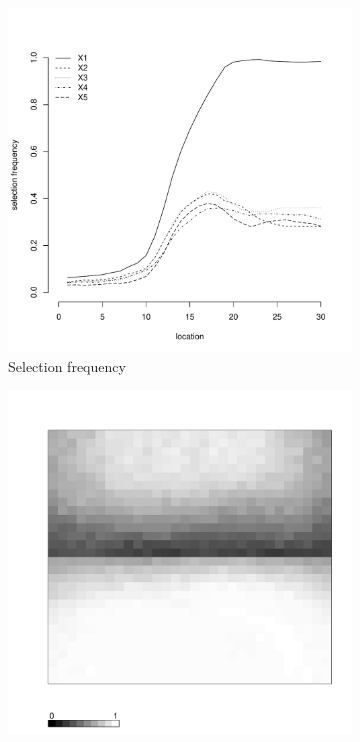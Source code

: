 \documentclass[authoryear, review, 11pt]{elsarticle}
\begin{document}
\begin{figure}
\begin{subfigure}[b]{0.45\textwidth}
		\includegraphics[width=\textwidth]{../../figures/simulation/15.25.profile_selection.pdf}
		\caption{Selection frequency}
	\end{subfigure}
	\begin{subfigure}[b]{0.45\textwidth}
	\centering
		\includegraphics[width=\textwidth]{../../figures/simulation/X1.15.25.unshrunk_bootstrap_coverage.pdf}

\end{subfigure}
\end{figure}
\end{document}
